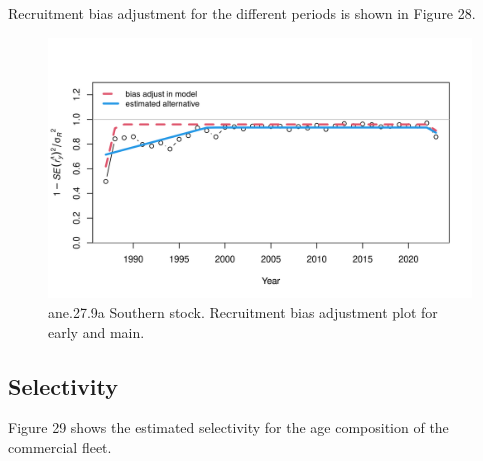 \documentclass[
]{article}
\begin{document}
Recruitment bias adjustment for the different periods is shown in Figure
28.

\begin{figure}[H]

{\centering \includegraphics[width=0.95\linewidth]{report/run/S1.0_4FLEETS_SelECO_RecIndex_Mnewfix/fig_recruit_fit_bias_adjust} 

}

\caption{ane.27.9a Southern stock. Recruitment bias adjustment plot for early and main.}\label{fig:unnamed-chunk-60}
\end{figure}

\hypertarget{selectivity-1}{%
\subsection{Selectivity}\label{selectivity-1}}

Figure 29 shows the estimated selectivity for the age composition of the
commercial fleet.
\end{document}

